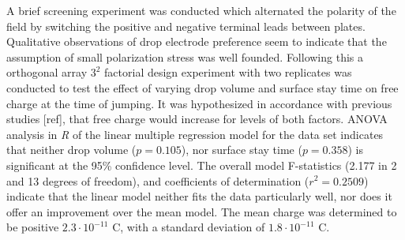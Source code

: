 \documentclass[12pt,a4paper,oneside]{book}
\begin{document}
A brief screening experiment was conducted which alternated the polarity of the field by switching the positive and negative terminal leads between plates. Qualitative observations of drop electrode preference seem to indicate that the assumption of small polarization stress was well founded. Following this a orthogonal array $3^2$ factorial design experiment with two replicates was conducted to test the effect of varying drop volume and surface stay time on free charge at the time of jumping. It was hypothesized in accordance with previous studies [ref], that free charge would increase for levels of both factors. ANOVA analysis in \emph{R} of the linear multiple regression model for the data set indicates that neither drop volume ($p=0.105$), nor surface stay time ($p=0.358$) is significant at the 95\% confidence level. The overall model F-statistics (2.177 in 2 and 13 degrees of freedom), and coefficients of determination ($r^2 = 0.2509$) indicate that the linear model neither fits the data particularly well, nor does it offer an improvement over the mean model. The mean charge was determined to be positive $2.3 \cdot 10^{-11}$ C, with a standard deviation of $1.8 \cdot 10^{-11}$ C.

\backmatter
\printbibliography
\end{document}
